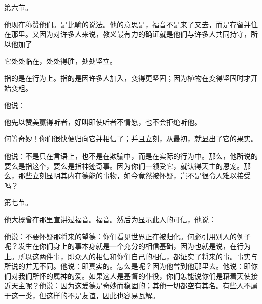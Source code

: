 第六节。 \par

他现在称赞他们。是比喻的说法。他的意思是，福音不是来了又去，而是存留并住在那里。又因为对许多人来说，教义最有力的确证就是他们与许多人共同持守，所以他加了\par

它处处临在，处处得胜，处处坚立。\par

\par

指的是在行为上。指的是因许多人加入，变得更坚固；因为植物在变得坚固时才开始变粗。\par

他说：\par

他先以赞美赢得听者，好叫即使听者不情愿，也不会拒绝听他。\par

\par

何等奇妙！你们很快便归向它并相信了；并且立刻，从最初，就显出了它的果实。\par

\par

他说：不是只在言语上，也不是在欺骗中，而是在实际的行为中。那么，他所说的要么是指这个，要么是指神迹奇事。因为你们一领受它，就认得天主的恩宠。那么，那些立刻显明其内在德能的事物，如今竟然被怀疑，岂不是很令人难以接受吗？\par

第七节。 \par

他大概曾在那里宣讲过福音。福音。然后为显示此人的可信，他说：\par

\par

他说：不要怀疑那将来的望德：你们看见世界正在被归化。何必引用别人的例子呢？发生在你们身上的事本身就是一个充分的相信基础，因为也就是说，在行为上。所以这两件事，即众人的相信和你们自己的相信，都证实了将来的事。事实与所说的并无不同。他说：即真实的。怎么是呢？因为他曾到他那里去。他说：即你们对我们所怀的属神的爱。如果这人是基督的仆役，你们怎能说你们是藉着天使接近天主呢？他说：因为这爱德是奇妙而稳固的；其他一切都空有其名。有些人不属于这一类，但这样的不是友谊，因此也容易瓦解。\par

